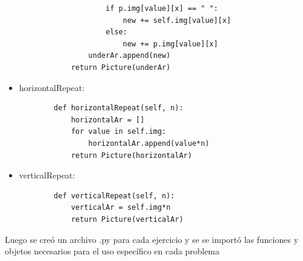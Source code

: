 \documentclass{article}
\begin{document}
\begin{itemize}
\begin{lstlisting}
					if p.img[value][x] == " ":
						new += self.img[value][x]
					else:
						new += p.img[value][x]
				underAr.append(new)
			return Picture(underAr)
		\end{lstlisting}
		\item horizontalRepeat:
		\begin{lstlisting}
		def horizontalRepeat(self, n):
			horizontalAr = []
			for value in self.img:
				horizontalAr.append(value*n)
			return Picture(horizontalAr)
		\end{lstlisting}
		\item verticalRepeat:
		\begin{lstlisting}
		def verticalRepeat(self, n):
			verticalAr = self.img*n
			return Picture(verticalAr)
		\end{lstlisting}
	\end{itemize}
	Luego se creó un archivo .py para cada ejercicio y se se importó las funciones y objetos necesarios para el uso específico en cada problema
\end{document}
